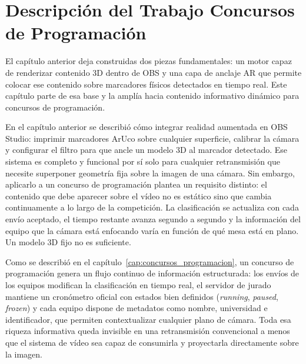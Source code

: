 \chapter{Descripción del Trabajo Concursos de Programación}

\label{cap:descripcionTrabajoConcursosProgramacion}


El capítulo anterior deja construidas dos piezas fundamentales: un motor capaz de renderizar contenido 3D dentro de OBS y una capa de anclaje AR que permite colocar ese contenido sobre marcadores físicos detectados en tiempo real. Este capítulo parte de esa base y la amplía hacia contenido informativo dinámico para concursos de programación.

En el capítulo anterior se describió cómo integrar realidad aumentada en OBS Studio:
imprimir marcadores ArUco sobre cualquier superficie, calibrar la cámara y configurar el filtro
para que ancle un modelo 3D al marcador detectado. Ese sistema es completo y funcional por sí
solo para cualquier retransmisión que necesite superponer geometría fija sobre la imagen de una
cámara. Sin embargo, aplicarlo a un concurso de programación plantea un requisito distinto: el
contenido que debe aparecer sobre el vídeo no es estático sino que cambia continuamente a lo
largo de la competición. La clasificación se actualiza con cada envío aceptado, el tiempo
restante avanza segundo a segundo y la información del equipo que la cámara está enfocando varía
en función de qué mesa está en plano. Un modelo 3D fijo no es suficiente.
 
Como se describió en el capítulo~\ref{cap:concursos_programacion}, un concurso de programación genera un
flujo continuo de información estructurada: los envíos de los equipos modifican la clasificación
en tiempo real, el servidor de jurado mantiene un cronómetro oficial con estados bien definidos
(\textit{running}, \textit{paused}, \textit{frozen}) y cada equipo dispone de metadatos como
nombre, universidad e identificador, que permiten contextualizar cualquier plano de cámara. Toda
esa riqueza informativa queda invisible en una retransmisión convencional a menos que el sistema
de vídeo sea capaz de consumirla y proyectarla directamente sobre la imagen.
 
